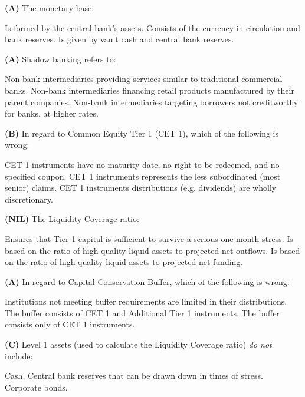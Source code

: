 \documentclass{exam}
\begin{document}
\begin{questions}
\question \textbf{(A)}
The monetary base:
\begin{choices}
\choice Is formed  by the central bank's assets.
\CorrectChoice Consists of the currency in circulation and bank reserves.
\choice Is given by vault cash and central bank reserves.
\end{choices}

\question \textbf{(A)}
Shadow banking refers to:
\begin{choices}
\CorrectChoice Non-bank intermediaries providing services similar to traditional commercial banks.
\choice Non-bank intermediaries financing retail products manufactured by their parent companies.
\choice Non-bank intermediaries targeting borrowers not creditworthy for banks, at higher rates.
\end{choices}

\question \textbf{(B)}
In regard to Common Equity Tier 1 (CET 1), which of the following is wrong:
\begin{choices}
\choice CET 1 instruments have no maturity date, no right to be redeemed, and no specified coupon.
\CorrectChoice CET 1 instruments represents the less subordinated (most senior) claims.
\choice CET 1 instruments distributions (e.g. dividends) are wholly discretionary.
\end{choices}

\question \textbf{(NIL)}
The Liquidity Coverage ratio:
\begin{choices}
\choice Ensures that Tier 1 capital is sufficient to survive a serious one-month stress.
\CorrectChoice Is based on the ratio of high-quality liquid assets to projected net outflows.
\choice Is based on the ratio of high-quality liquid assets to projected net funding.
\end{choices}

\question \textbf{(A)}
In regard to Capital Conservation Buffer, which of the following is wrong:
\begin{choices}
\choice Institutions not meeting buffer requirements are limited in their distributions.
\CorrectChoice The buffer consists of CET 1 and Additional Tier 1 instruments.
\choice The buffer consists only of CET 1 instruments.
\end{choices}

\question \textbf{(C)}
Level 1 assets (used to calculate the Liquidity Coverage ratio) \emph{do not} include:
\begin{choices}
\choice Cash.
\choice Central bank reserves that can be drawn down in times of stress.
\CorrectChoice Corporate bonds.
\end{choices}
  
\end{questions}
\end{document}
